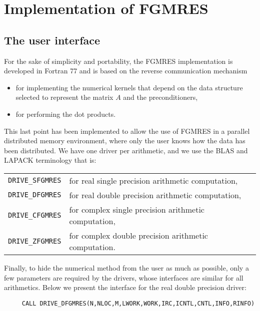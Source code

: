 \newcommand{\verba}[1]{\texttt{#1}}
\newcommand{\Paramlabel}[1]{\mbox{\texttt{#1}}\hfill}
\newenvironment{listparam}
 {\begin{list}{}
     {\renewcommand{\makelabel}{\Paramlabel}
        \setlength{\labelwidth}{2.0cm}
        \setlength{\itemsep}{0.05cm}
        \setlength{\leftmargin}{2.1cm}
     }
  }
 {\end{list}}

\section{Implementation of FGMRES}\label{sec:interf}

%
\subsection{The user interface}
%
  For the sake of simplicity and portability, the FGMRES implementation
is developed in Fortran 77 and is based on the reverse communication mechanism
\begin{itemize}
  \item for implementing the numerical kernels that depend on the data
   structure selected to represent the matrix $A$ and the preconditioners,
\item for performing the dot products.
\end{itemize}
This last point has been implemented to allow the use of FGMRES
in a parallel distributed memory environment, where only the user
knows how the data has been distributed. 
We have one driver per arithmetic, and we use the BLAS and LAPACK
terminology that is:
\begin{center}
\begin{tabularx}{\linewidth}{l X}
 \texttt{DRIVE\_SFGMRES} & for real single precision arithmetic computation, \\
 \texttt{DRIVE\_DFGMRES} & for real double precision arithmetic computation, \\
 \texttt{DRIVE\_CFGMRES} & for complex single precision arithmetic computation,\\
 \texttt{DRIVE\_ZFGMRES} & for complex double precision arithmetic computation. \\
\end{tabularx}
\end{center}
Finally, to hide the numerical method from the user as much as possible,
only a few parameters are required by the drivers, whose interfaces are
similar for all arithmetics.
Below we present the interface for the real double precision driver:
\begin{verbatim}
     CALL DRIVE_DFGMRES(N,NLOC,M,LWORK,WORK,IRC,ICNTL,CNTL,INFO,RINFO)
\end{verbatim}




